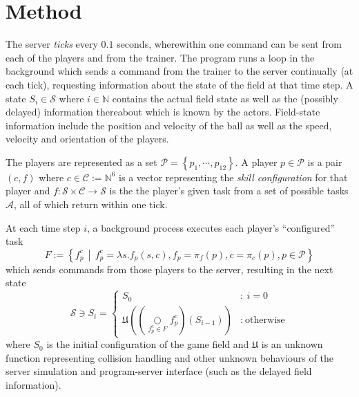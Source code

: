 \documentclass[10pt,a4paper]{article}
\begin{document}
\section{Method}

The server \textit{ticks} every \(0.1\) seconds, wherewithin one command can be sent from each of the players and from the trainer. The program runs a loop in the background which sends a command from the trainer to the server continually (at each tick), requesting information about the state of the field at that time step. A state \(S_i \in \mathcal{S}\) where \(i \in \mathbb{N}\) contains the actual field state as well as the (possibly delayed) information thereabout which is known by the actors. Field-state information include the position and velocity of the ball as well as the speed, velocity and orientation of the players.

The players are represented as a set \(\mathcal{P}=\left\{p_1,\cdots,p_{12}\right\}\). A player \(p \in \mathcal{P}\) is a pair \((c, f)\) where \(c \in \mathcal{C} := \mathbb{N}^6\) is a vector representing the \textit{skill configuration} for that player and \(f : \mathcal{S}\times \mathcal{C} \to \mathcal{S}\) is the the player's given task from a set of possible tasks \(\mathcal{A}\), all of which return within one tick.

At each time step \(i\), a background process executes each player's ``configured'' task
\[
		F := \left\{ f_p^c \,\middle|\, f_p^c = \lambda s.f_p(s, c), f_p = \pi_f(p), c = \pi_c(p), p \in\mathcal{P} \right\}
\]
which sends commands from those players to the server, resulting in the next state 
\[
		\mathcal{S} \ni S_{i} = \left\{
			\begin{array}{cl}
				S_0 & : \ i = 0 \\
					\mathfrak{U} \left( \left(\underset{f_p^c\in F}\bigcirc f_p^c\right)(S_{i-1}) \right) & : \ \text{otherwise}
			\end{array}
		\right.
\]
where \(S_0\) is the initial configuration of the game field and \(\mathfrak{U}\) is an unknown function representing collision handling and other unknown behaviours of the server simulation and program-server interface (such as the delayed field information). %
\end{document}
